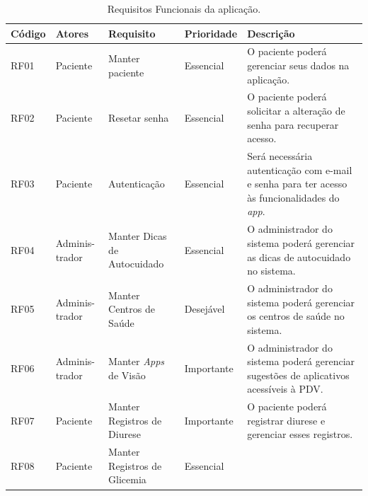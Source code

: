 \begin{table}[htb]
    \begin{center}
        \ABNTEXfontereduzida
        \caption{Requisitos Funcionais da aplicação.}
        \label{tab-req-fun}
        \begin{tabular}{p{1.1cm}|p{1.3cm}|p{3.0cm}|p{1.5cm}|p{6.7cm}}
            \textbf{Código} & \textbf{Atores} & \textbf{Requisito}              & \textbf{Prioridade} & \textbf{Descrição} \\
            \hline
            RF01            & Paciente        & Manter paciente                 & Essencial           &
            O paciente poderá gerenciar seus dados na aplicação.                                                           \\
            \hline
            RF02            & Paciente        & Resetar senha                   & Essencial           &
            O paciente poderá solicitar a alteração de senha para recuperar acesso.                                        \\
            \hline
            RF03            & Paciente        & Autenticação                    & Essencial           &
            Será necessária autenticação com e-mail e senha para ter acesso às funcionalidades do \emph{app}.              \\
            \hline
            RF04            & Adminis-trador  & Manter Dicas de Autocuidado     & Essencial           &
            O administrador do sistema poderá gerenciar as dicas de autocuidado no sistema.                                \\
            \hline
            RF05            & Adminis-trador  & Manter Centros de Saúde         & Desejável           &
            O administrador do sistema poderá gerenciar os centros de saúde no sistema.                                    \\
            \hline
            RF06            & Adminis-trador  & Manter \emph{Apps} de Visão     & Importante          &
            O administrador do sistema poderá gerenciar sugestões de aplicativos acessíveis à PDV\@.                       \\
            \hline
            RF07            & Paciente        & Manter Registros de Diurese     & Importante          &
            O paciente poderá registrar diurese e gerenciar esses registros.                                               \\
            \hline
            RF08            & Paciente        & Manter Registros de Glicemia    & Essencial           &

\end{tabular}
\end{center}
\end{table}
